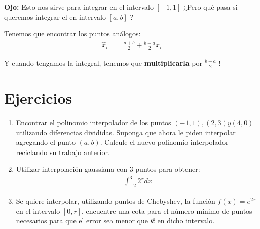 \documentclass[spanish, fleqn]{article}
\begin{document}
\textbf{Ojo:} Esto nos sirve para integrar en el intervalo $[-1,1]$ ¿Pero qué pasa si queremos integrar el en intervalo $[a,b]$ ?

Tenemos que encontrar los puntos análogos:
\begin{align*}
\hat{x}_i &= \frac{a+b}{2}+\frac{b-a}{2}x_i
\end{align*}

Y cuando tengamos la integral, tenemos que \textbf{multiplicarla} por $\frac{b-a}{2}$ !

\section{Ejercicios}

\begin{enumerate}
\item Encontrar el polinomio interpolador de los puntos $(-1,1),(2,3) y (4,0)$ utilizando diferencias divididas. Suponga que ahora le piden interpolar agregando el punto $(a,b)$. Calcule el nuevo polinomio interpolador reciclando su trabajo anterior.
\item Utilizar interpolación gaussiana con 3 puntos para obtener:
\begin{align*}
\int_{-2}^{3} 2^x dx
\end{align*}
\item Se quiere interpolar, utilizando puntos de Chebyshev, la función $f(x) = e^{2x}$ en el intervalo $[0,r]$, encuentre una cota para el número mínimo de puntos necesarios para que el error sea menor que $\mathfrak{E}$ en dicho intervalo.
\end{enumerate}
\end{document}
